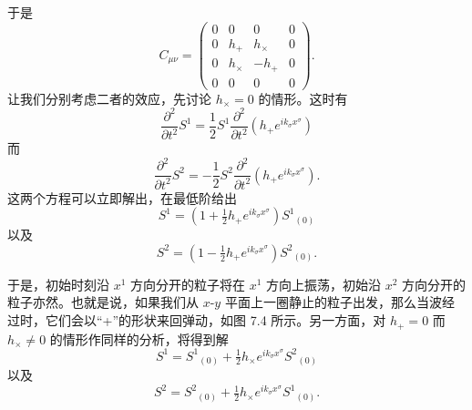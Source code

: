 
于是
\begin{equation*}
C_{\mu\nu} =
\begin{pmatrix}
0 & 0 & 0 & 0 \\
0 & h_+ & h_\times & 0 \\
0 & h_\times & -h_+ & 0 \\
0 & 0 & 0 & 0
\end{pmatrix}.
\tag{7.109}
\end{equation*}
让我们分别考虑二者的效应，先讨论 $h_\times = 0$ 的情形。这时有
\begin{equation*}
\frac{\partial^2}{\partial t^2}S^1 = \frac{1}{2}S^1\frac{\partial^2}{\partial t^2}(h_+e^{ik_\sigma x^\sigma})
\tag{7.110}
\end{equation*}
而
\begin{equation*}
\frac{\partial^2}{\partial t^2}S^2 = -\frac{1}{2}S^2\frac{\partial^2}{\partial t^2}(h_+e^{ik_\sigma x^\sigma}).
\tag{7.111}
\end{equation*}
这两个方程可以立即解出，在最低阶给出
\begin{equation*}
S^1 = \left(1 + \tfrac{1}{2}h_+e^{ik_\sigma x^\sigma}\right)S^{1}{}_{(0)}
\tag{7.112}
\end{equation*}
以及
\begin{equation*}
S^2 = \left(1 - \tfrac{1}{2}h_+e^{ik_\sigma x^\sigma}\right)S^{2}{}_{(0)}.
\tag{7.113}
\end{equation*}

于是，初始时刻沿 $x^1$ 方向分开的粒子将在 $x^1$ 方向上振荡，初始沿 $x^2$ 方向分开的粒子亦然。也就是说，如果我们从 $x$-$y$ 平面上一圈静止的粒子出发，那么当波经过时，它们会以“+”的形状来回弹动，如图 7.4 所示。另一方面，对 $h_+ = 0$ 而 $h_\times \neq 0$ 的情形作同样的分析，将得到解
\begin{equation*}
S^1 = S^{1}{}_{(0)} + \tfrac{1}{2}h_\times e^{ik_\sigma x^\sigma}S^{2}{}_{(0)}
\tag{7.114}
\end{equation*}
以及
\begin{equation*}
S^2 = S^{2}{}_{(0)} + \tfrac{1}{2}h_\times e^{ik_\sigma x^\sigma}S^{1}{}_{(0)}.
\tag{7.115}
\end{equation*}




